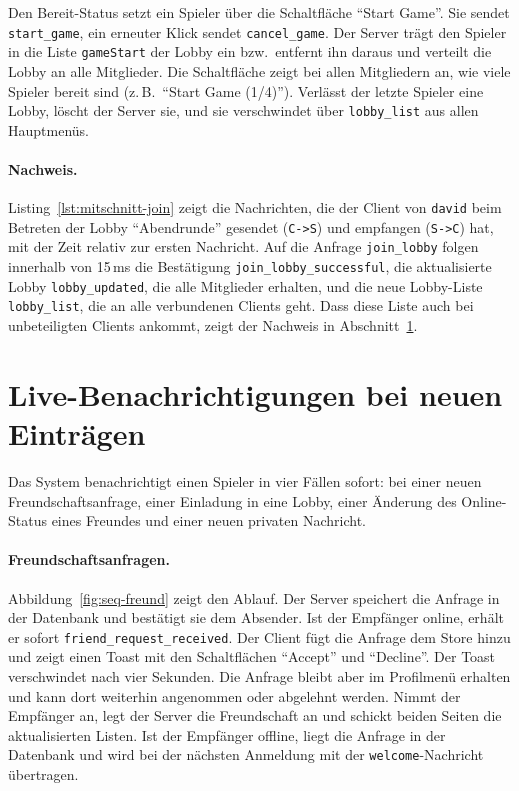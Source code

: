 Den Bereit-Status setzt ein Spieler über die Schaltfläche \enquote{Start Game}. Sie sendet \texttt{start\_game}, ein erneuter Klick sendet \texttt{cancel\_game}. Der Server trägt den Spieler in die Liste \texttt{gameStart} der Lobby ein bzw.\ entfernt ihn daraus und verteilt die Lobby an alle Mitglieder. Die Schaltfläche zeigt bei allen Mitgliedern an, wie viele Spieler bereit sind (z.\,B.\ \enquote{Start Game (1/4)}). Verlässt der letzte Spieler eine Lobby, löscht der Server sie, und sie verschwindet über \texttt{lobby\_list} aus allen Hauptmenüs.

\paragraph{Nachweis.} Listing~\ref{lst:mitschnitt-join} zeigt die Nachrichten, die der Client von \texttt{david} beim Betreten der Lobby \enquote{Abendrunde} gesendet (\texttt{C->S}) und empfangen (\texttt{S->C}) hat, mit der Zeit relativ zur ersten Nachricht. Auf die Anfrage \texttt{join\_lobby} folgen innerhalb von 15\,ms die Bestätigung \texttt{join\_lobby\_successful}, die aktualisierte Lobby \texttt{lobby\_updated}, die alle Mitglieder erhalten, und die neue Lobby-Liste \texttt{lobby\_list}, die an alle verbundenen Clients geht. Dass diese Liste auch bei unbeteiligten Clients ankommt, zeigt der Nachweis in Abschnitt~\ref{sec:req-benachrichtigung}.



\section{Live-Benachrichtigungen bei neuen Einträgen}
\label{sec:req-benachrichtigung}

Das System benachrichtigt einen Spieler in vier Fällen sofort: bei einer neuen Freundschaftsanfrage, einer Einladung in eine Lobby, einer Änderung des Online-Status eines Freundes und einer neuen privaten Nachricht.

\paragraph{Freundschaftsanfragen.} Abbildung~\ref{fig:seq-freund} zeigt den Ablauf. Der Server speichert die Anfrage in der Datenbank und bestätigt sie dem Absender. Ist der Empfänger online, erhält er sofort \texttt{friend\_request\_received}. Der Client fügt die Anfrage dem Store hinzu und zeigt einen Toast mit den Schaltflächen \enquote{Accept} und \enquote{Decline}. Der Toast verschwindet nach vier Sekunden. Die Anfrage bleibt aber im Profilmenü erhalten und kann dort weiterhin angenommen oder abgelehnt werden. Nimmt der Empfänger an, legt der Server die Freundschaft an und schickt beiden Seiten die aktualisierten Listen. Ist der Empfänger offline, liegt die Anfrage in der Datenbank und wird bei der nächsten Anmeldung mit der \texttt{welcome}-Nachricht übertragen.


